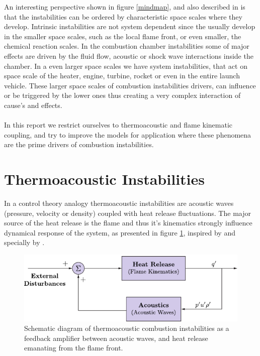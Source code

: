 An interesting perspective shown in figure \ref{mindmap}, and also described in \cite{barrere} is that the instabilities can be ordered by characteristic space scales where they develop. Intrinsic instabilities are not system dependent since the usually develop in the smaller space scales, such as the local flame front, or even smaller, the chemical reaction scales. In the combustion chamber instabilities some of major effects are driven by the fluid flow, acoustic or shock wave interactions inside the chamber. In a even larger space scales we have system instabilities, that act on space scale of the heater, engine, turbine, rocket or even in the entire launch vehicle.
 These larger space scales of combustion instabilities drivers, can influence or be triggered by the lower ones thus creating a very complex interaction of cause's and effects.
\\\\
In this report we restrict ourselves to thermoacoustic and flame kinematic coupling, and try to improve the models for application where these phenomena are the prime drivers of combustion instabilities. 

\section{Thermoacoustic Instabilities}
In a control theory analogy thermoacoustic instabilities are acoustic waves (pressure, velocity or density) coupled with heat release fluctuations. The major source of the heat release is the flame and thus it's kinematics strongly influence dynamical response of the system, as presented in figure \ref{feedback_combustion}, inspired by \cite{nato} and specially by \cite{ghoniem}.

\begin{figure}[h!]
\begin{center}
\includegraphics[scale=1.2]{./img/feedback_combustion}
\end{center}
\caption{Schematic diagram of thermoacoustic combustion instabilities as a feedback amplifier between acoustic waves, and heat release emanating from the flame front.}
\label{feedback_combustion}
\end{figure}

